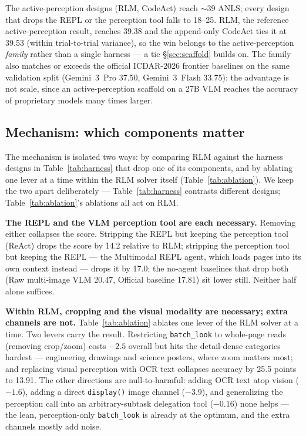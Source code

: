 The active-perception designs (RLM, CodeAct) reach $\sim$39 ANLS; every design that drops the REPL or the perception tool falls to 18--25. RLM, the reference active-perception result, reaches 39.38 and the append-only CodeAct ties it at 39.53 (within trial-to-trial variance), so the win belongs to the active-perception \emph{family} rather than a single harness --- a tie \S\ref{sec:scaffold} builds on. The family also matches or exceeds the official ICDAR-2026 frontier baselines on the same validation split (Gemini~3~Pro 37.50, Gemini~3~Flash 33.75): the advantage is not scale, since an active-perception scaffold on a 27B VLM reaches the accuracy of proprietary models many times larger.

\subsection{Mechanism: which components matter}
\label{sec:mechanism}

The mechanism is isolated two ways: by comparing RLM against the harness designs in Table~\ref{tab:harness} that drop one of its components, and by ablating one lever at a time within the RLM solver itself (Table~\ref{tab:ablation}). We keep the two apart deliberately --- Table~\ref{tab:harness} contrasts different designs; Table~\ref{tab:ablation}'s ablations all act on RLM.

\textbf{The REPL and the VLM perception tool are each necessary.} Removing either collapses the score. Stripping the REPL but keeping the perception tool (ReAct) drops the score by 14.2 relative to RLM; stripping the perception tool but keeping the REPL --- the Multimodal REPL agent, which loads pages into its own context instead --- drops it by 17.0; the no-agent baselines that drop both (Raw multi-image VLM 20.47, Official baseline 17.81) sit lower still. Neither half alone suffices.

\textbf{Within RLM, cropping and the visual modality are necessary; extra channels are not.} Table~\ref{tab:ablation} ablates one lever of the RLM solver at a time. Two levers carry the result. Restricting \texttt{batch\_look} to whole-page reads (removing crop/zoom) costs $-2.5$ overall but hits the detail-dense categories hardest --- engineering drawings and science posters, where zoom matters most; and replacing visual perception with OCR text collapses accuracy by 25.5 points to 13.91. The other directions are null-to-harmful: adding OCR text atop vision ($-1.6$), adding a direct \texttt{display()} image channel ($-3.9$), and generalizing the perception call into an arbitrary-subtask delegation tool ($-0.16$) none helps --- the lean, perception-only \texttt{batch\_look} is already at the optimum, and the extra channels mostly add noise.

